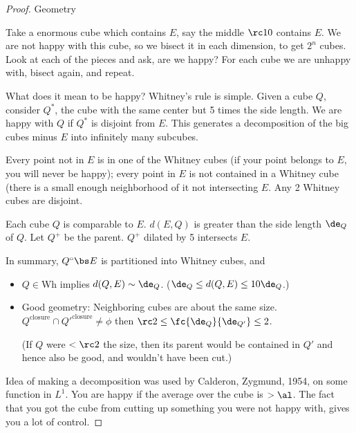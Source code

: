 \begin{proof}

 Geometry

Take a enormous cube which contains $E$, say the middle $\rc 10$ contains $E$. We are not happy with this cube, so we bisect it in each dimension, to get $2^n$ cubes. Look at each of the pieces and ask, are we happy? For each cube we are unhappy with, bisect again, and repeat. 

What does it mean to be happy? Whitney's rule is simple. Given a cube $Q$, consider $Q^*$, the cube with the same center but 5 times the side length. We are happy with $Q$ if $Q^*$ is disjoint from $E$. This generates a decomposition of the big cubes minus $E$ into infinitely many subcubes. 

Every point not in $E$ is in one of the Whitney cubes (if your point belongs to $E$, you will never be happy); every point in $E$ is not contained in a Whitney cube (there is a small enough neighborhood of it not intersecting $E$.  Any 2 Whitney cubes are disjoint.


Each cube $Q$ is comparable to $E$. 
$d(E,Q)$ is greater than the side length $\de_Q$ of $Q$.
Let $Q^+$ be the parent. $Q^+$ dilated by 5 intersects $E$. 

In summary, $Q^\circ \bs E$ is partitioned into Whitney cubes, and
\begin{itemize}
\item
$Q\in$Wh implies $d(Q,E)\sim \de_Q$. 
($\de_Q\le d(Q,E)\le 10\de_Q$.)
\item
Good geometry: Neighboring cubes are about the same size. $Q^{\text{closure}}\cap {Q'}^{\text{closure}}\ne \phi$ then $\rc 2 \le \fc{\de_Q}{\de_{Q'}}\le 2$. 

(If $Q$ were $<\rc 2$ the size, then its parent would be contained in $Q'$ and hence also be good, and wouldn't have been cut.)
\end{itemize}
Idea of making a decomposition was used by Calderon, Zygmund, 1954, on some function in $L^1$. You are happy if the average over the cube is $> \al$. The fact that you got the cube from cutting up something you were not happy with, gives you a lot of control. 


\end{proof}
